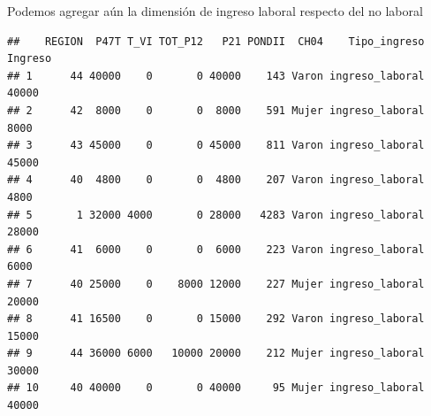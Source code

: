 \documentclass[]{book}
\newenvironment{Shaded}{\begin{snugshade}}{\end{snugshade}}
\newcommand{\CommentTok}[1]{\textcolor[rgb]{0.56,0.35,0.01}{\textit{#1}}}
\newcommand{\DataTypeTok}[1]{\textcolor[rgb]{0.13,0.29,0.53}{#1}}
\newcommand{\DecValTok}[1]{\textcolor[rgb]{0.00,0.00,0.81}{#1}}
\newcommand{\KeywordTok}[1]{\textcolor[rgb]{0.13,0.29,0.53}{\textbf{#1}}}
\newcommand{\NormalTok}[1]{#1}
\newcommand{\OperatorTok}[1]{\textcolor[rgb]{0.81,0.36,0.00}{\textbf{#1}}}
\newcommand{\StringTok}[1]{\textcolor[rgb]{0.31,0.60,0.02}{#1}}
\begin{document}
Podemos agregar aún la dimensión de ingreso laboral respecto del no laboral

\begin{Shaded}
\end{Shaded}

\begin{verbatim}
##    REGION  P47T T_VI TOT_P12   P21 PONDII  CH04    Tipo_ingreso Ingreso
## 1      44 40000    0       0 40000    143 Varon ingreso_laboral   40000
## 2      42  8000    0       0  8000    591 Mujer ingreso_laboral    8000
## 3      43 45000    0       0 45000    811 Varon ingreso_laboral   45000
## 4      40  4800    0       0  4800    207 Varon ingreso_laboral    4800
## 5       1 32000 4000       0 28000   4283 Varon ingreso_laboral   28000
## 6      41  6000    0       0  6000    223 Varon ingreso_laboral    6000
## 7      40 25000    0    8000 12000    227 Mujer ingreso_laboral   20000
## 8      41 16500    0       0 15000    292 Varon ingreso_laboral   15000
## 9      44 36000 6000   10000 20000    212 Mujer ingreso_laboral   30000
## 10     40 40000    0       0 40000     95 Mujer ingreso_laboral   40000
\end{verbatim}
\end{document}
